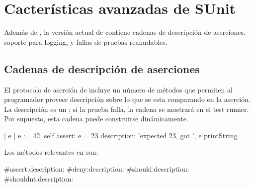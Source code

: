 \documentclass[a4paper,10pt,twoside]{book}
\begin{document}





\section{Cacter\'isticas avanzadas de SUnit}

Adem\'as de , la versi\'on actual de \sunit contiene cadenas de descripci\'on de aserciones,
soporte para logging, y fallas de pruebas reanudables.

\subsection{Cadenas de descripci\'on de aserciones}

El protocolo de aserci\'on de  incluye un n\'umero de m\'etodos que permiten
al programador proveer descripci\'on sobre lo que se esta comparando en la aserci\'on. La descripci\'on
es un ; si la prueba falla, la cadena se mostrar\'a en el test runner. Por supuesto, esta cadena
puede construirse din\'amicamente.

\begin{code}{}
| e |
e := 42.
self assert: e = 23
	description: 'expected 23, got ', e printString
\end{code}

Los  m\'etodos relevantes en  son:
\begin{code}{}
#assert:description:
#deny:description:
#should:description:
#shouldnt:description:
\end{code}
\end{document}
